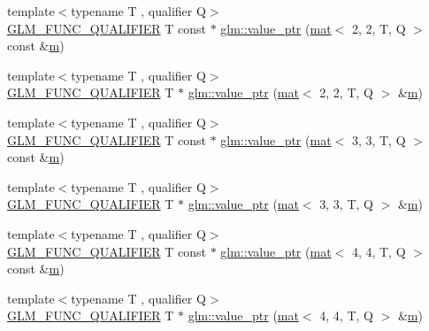 \begin{DoxyCompactItemize}
\item 
{\footnotesize template$<$typename T , qualifier Q$>$ }\\\hyperlink{setup_8hpp_a33fdea6f91c5f834105f7415e2a64407}{G\+L\+M\+\_\+\+F\+U\+N\+C\+\_\+\+Q\+U\+A\+L\+I\+F\+I\+ER} T const  $\ast$ \hyperlink{group__gtc__type__ptr_ga6144a4839923074f038b63506b855faf}{glm\+::value\+\_\+ptr} (\hyperlink{structglm_1_1mat}{mat}$<$ 2, 2, T, Q $>$ const \&\hyperlink{_s_d_l__opengl__glext_8h_af593500c283bf1a787a6f947f503a5c2}{m})
\item 
{\footnotesize template$<$typename T , qualifier Q$>$ }\\\hyperlink{setup_8hpp_a33fdea6f91c5f834105f7415e2a64407}{G\+L\+M\+\_\+\+F\+U\+N\+C\+\_\+\+Q\+U\+A\+L\+I\+F\+I\+ER} T $\ast$ \hyperlink{group__gtc__type__ptr_gac636dcc35b194f5e950a3d0fb9ef44ef}{glm\+::value\+\_\+ptr} (\hyperlink{structglm_1_1mat}{mat}$<$ 2, 2, T, Q $>$ \&\hyperlink{_s_d_l__opengl__glext_8h_af593500c283bf1a787a6f947f503a5c2}{m})
\item 
{\footnotesize template$<$typename T , qualifier Q$>$ }\\\hyperlink{setup_8hpp_a33fdea6f91c5f834105f7415e2a64407}{G\+L\+M\+\_\+\+F\+U\+N\+C\+\_\+\+Q\+U\+A\+L\+I\+F\+I\+ER} T const  $\ast$ \hyperlink{group__gtc__type__ptr_gad80f09b66c6f11043ea79e506d141594}{glm\+::value\+\_\+ptr} (\hyperlink{structglm_1_1mat}{mat}$<$ 3, 3, T, Q $>$ const \&\hyperlink{_s_d_l__opengl__glext_8h_af593500c283bf1a787a6f947f503a5c2}{m})
\item 
{\footnotesize template$<$typename T , qualifier Q$>$ }\\\hyperlink{setup_8hpp_a33fdea6f91c5f834105f7415e2a64407}{G\+L\+M\+\_\+\+F\+U\+N\+C\+\_\+\+Q\+U\+A\+L\+I\+F\+I\+ER} T $\ast$ \hyperlink{group__gtc__type__ptr_ga7bafdd942876d208a5fc34faa4518c36}{glm\+::value\+\_\+ptr} (\hyperlink{structglm_1_1mat}{mat}$<$ 3, 3, T, Q $>$ \&\hyperlink{_s_d_l__opengl__glext_8h_af593500c283bf1a787a6f947f503a5c2}{m})
\item 
{\footnotesize template$<$typename T , qualifier Q$>$ }\\\hyperlink{setup_8hpp_a33fdea6f91c5f834105f7415e2a64407}{G\+L\+M\+\_\+\+F\+U\+N\+C\+\_\+\+Q\+U\+A\+L\+I\+F\+I\+ER} T const  $\ast$ \hyperlink{group__gtc__type__ptr_ga72565b63af29f056843ecd4956b3c738}{glm\+::value\+\_\+ptr} (\hyperlink{structglm_1_1mat}{mat}$<$ 4, 4, T, Q $>$ const \&\hyperlink{_s_d_l__opengl__glext_8h_af593500c283bf1a787a6f947f503a5c2}{m})
\item 
{\footnotesize template$<$typename T , qualifier Q$>$ }\\\hyperlink{setup_8hpp_a33fdea6f91c5f834105f7415e2a64407}{G\+L\+M\+\_\+\+F\+U\+N\+C\+\_\+\+Q\+U\+A\+L\+I\+F\+I\+ER} T $\ast$ \hyperlink{group__gtc__type__ptr_ga68a08cd646559275950123dfffbdaf55}{glm\+::value\+\_\+ptr} (\hyperlink{structglm_1_1mat}{mat}$<$ 4, 4, T, Q $>$ \&\hyperlink{_s_d_l__opengl__glext_8h_af593500c283bf1a787a6f947f503a5c2}{m})

\end{DoxyCompactItemize}
